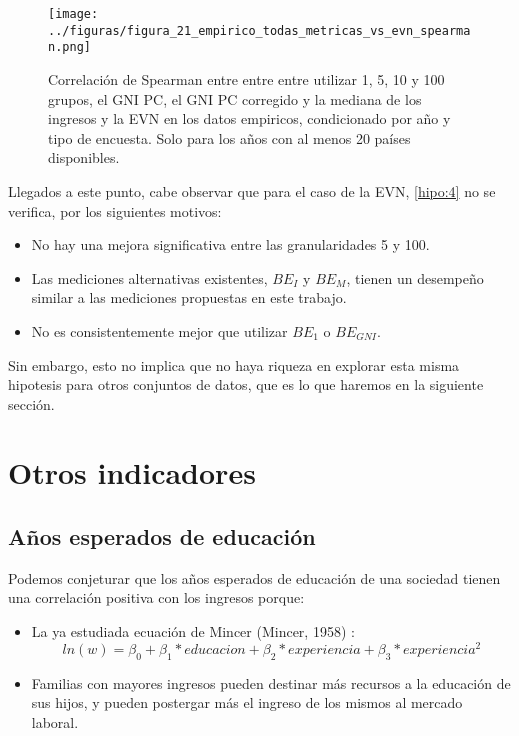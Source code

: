 \begin{figure}[H] %
    \centering %
    \texttt{[image: ../figuras/figura\_21\_empirico\_todas\_metricas\_vs\_evn\_spearman.png]} %
    \caption{Correlación de Spearman entre entre entre utilizar 1, 5, 10 y 100 grupos, el GNI PC, el GNI PC corregido y la mediana de los ingresos y la EVN en los datos empiricos, condicionado por año y tipo de encuesta. Solo para los años con al menos 20 países disponibles.}
    \label{fig:21} %
\end{figure}


Llegados a este punto, cabe observar que para el caso de la EVN, \ref{hipo:4} no se verifica, por los siguientes motivos:

\begin{itemize}
    \item No hay una mejora significativa entre las granularidades 5 y 100.
    \item Las mediciones alternativas existentes, $BE_I$ y $BE_M$, tienen un desempeño similar a las mediciones propuestas en este trabajo.
    \item No es consistentemente mejor que utilizar $BE_1$ o $BE_{GNI}$.
\end{itemize}

Sin embargo, esto no implica que no haya riqueza en explorar esta misma hipotesis para otros conjuntos de datos, que es lo que haremos en la siguiente sección.

\section{Otros indicadores}

\subsection{Años esperados de educación}

Podemos conjeturar que los años esperados de educación de una sociedad tienen una correlación positiva con los ingresos porque:

\begin{itemize}
    \item La ya estudiada ecuación de Mincer (Mincer, 1958) \cite{mincer1958investment}: $$ ln(w) = \beta_0 + \beta_1 * educacion + \beta_2 * experiencia + \beta_3 * experiencia^2$$
    \item Familias con mayores ingresos pueden destinar más recursos a la educación de sus hijos, y pueden postergar más el ingreso de los mismos al mercado laboral.  
\end{itemize}

